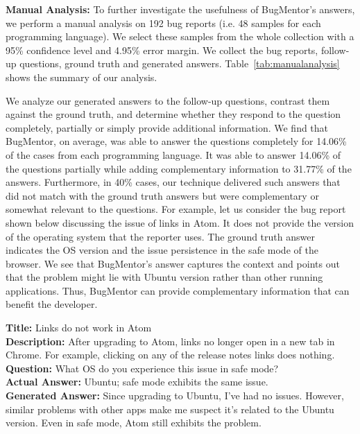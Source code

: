 \textbf{Manual Analysis:}
To further investigate the usefulness of BugMentor's answers, we perform a manual analysis on 192 bug reports (i.e. 48 samples for each programming language). We select these samples from the whole collection with a 95\% confidence level and 4.95\% error margin. We collect the bug reports, follow-up questions, ground truth and generated answers. Table~\ref{tab:manualanalysis} shows the summary of our analysis. \par

We analyze our generated answers to the follow-up questions, contrast them against the ground truth, and determine whether they respond to the question completely, partially or simply provide additional information. We find that BugMentor, on average, was able to answer the questions completely for 14.06\% of the cases from each programming language. It was able to answer 14.06\% of the questions partially while adding complementary information to 31.77\% of the answers. Furthermore, in 40\% cases, our technique delivered such answers that did not match with the ground truth answers but were complementary or somewhat relevant to the questions. For example, let us consider the bug report shown below discussing the issue of links in Atom. It does not provide the version of the operating system that the reporter uses. The ground truth answer indicates the OS version and the issue persistence in the safe mode of the browser. We see that BugMentor's answer captures the context and points out that the problem might lie with Ubuntu version rather than other running applications. Thus, BugMentor can provide complementary information that can benefit the developer.


\begin{frshaded}
\noindent
\textbf{Title:} Links do not work in Atom \\
\textbf{Description:} After upgrading to Atom, links no longer open in a new tab in Chrome. For example, clicking on any of the release notes links does nothing. \\
\textbf{Question:} What OS do you experience this issue in safe mode? \\
\textbf{Actual Answer:} Ubuntu; safe mode exhibits the same issue. \\
\textbf{Generated Answer:} Since upgrading to Ubuntu, I've had no issues. However, similar problems with other apps make me suspect it's related to the Ubuntu version. Even in safe mode, Atom still exhibits the problem.
\end{frshaded}

